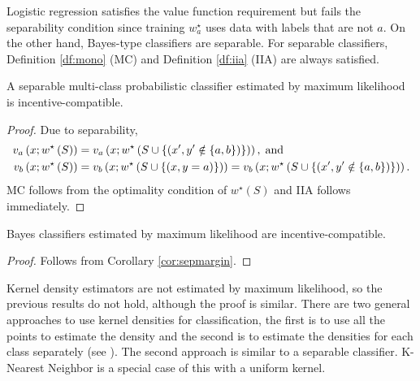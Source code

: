 \documentclass{article}
\begin{document}
Logistic regression satisfies the value function requirement but fails the separability condition since training $w^\star _{a}$ uses data with labels that are not $a $. On the other hand, Bayes-type classifiers are separable. For separable classifiers, Definition \ref{df:mono} (MC) and Definition \ref{df:iia} (IIA) are always satisfied.
\newline \newline
\begin{cor} \label{cor:sepmargin} 
A separable multi-class probabilistic classifier estimated by maximum likelihood is incentive-compatible.
\end{cor}
\begin{proof} \label{proof:sepmarginpf} 
Due to separability,
\begin{align*}
v_{a}\left(x; w^\star \left(S\right)\right) &= v_{a}\left(x; w^\star \left(S \cup \left\{\left(x', y' \notin \left\{a, b\right\}\right)\right\}\right)\right), \text{\;and\;}
\\ v_{b}\left(x; w^\star \left(S\right)\right) &= v_{b}\left(x; w^\star \left(S \cup \left\{\left(x, y = a\right)\right\}\right)\right) = v_{b}\left(x; w^\star \left(S \cup \left\{\left(x', y' \notin \left\{a, b\right\}\right)\right\}\right)\right).
\end{align*}
MC follows from the optimality condition of $w^\star \left(S\right)$ and IIA follows immediately.
\newline \newline\end{proof}
\begin{cor} \label{cor:bc} 
Bayes classifiers estimated by maximum likelihood are incentive-compatible.
\end{cor}
\begin{proof} \label{proof:bcpf} 
Follows from Corollary \ref{cor:sepmargin}.
\newline \newline\end{proof}
Kernel density estimators are not estimated by maximum likelihood, so the previous results do not hold, although the proof is similar. There are two general approaches to use kernel densities for classification, the first is to use all the points to estimate the density and the second is to estimate the densities for each class separately (see \citet*{taylor1997classification}). The second approach is similar to a separable classifier. K-Nearest Neighbor is a special case of this with a uniform kernel.
\newline \newline
\end{document}
